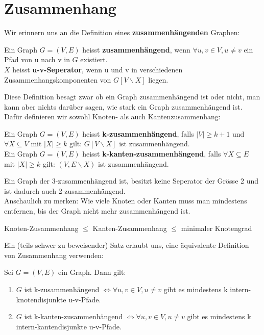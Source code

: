\documentclass[a4paper]{report}
\begin{document}
\chapter{Zusammenhang}

Wir erinnern uns an die Definition eines \textbf{zusammenhängenden} Graphen:

\begin{definition}
    Ein Graph $G = (V,E)$ heisst \textbf{zusammenhängend}, wenn $\forall u,v \in V, u \neq v$ 
    ein Pfad von u nach v in $G$ existiert. \\

    $X$ heisst \textbf{u-v-Seperator}, wenn u und v in verschiedenen Zusammenhangskomponenten von
    $G[V \backslash X]$ liegen.
\end{definition}
\bigskip

Diese Definition besagt zwar ob ein Graph zusammenhängend ist oder nicht, man kann aber nichts darüber sagen,
wie stark ein Graph zusammenhängend ist. Dafür definieren wir sowohl Knoten- als auch Kantenzusammenhang:

\begin{definition}
    Ein Graph $G = (V,E)$ heisst \textbf{k-zusammenhängend}, falls $|V| \geq k + 1$ und $\forall X \subseteq V$
    mit $|X| \geq k$ gilt: $G[V \backslash X]$ ist zusammenhängend. \\

    Ein Graph $G = (V,E)$ heisst \textbf{k-kanten-zusammenhängend}, falls $\forall X \subseteq E$
    mit $|X| \geq k$ gilt: $(V, E \backslash X)$ ist zusammenhängend.
\end{definition}
\bigskip

Ein Graph der 3-zusammenhängend ist, besitzt keine Seperator der Grösse 2 und ist dadurch auch 2-zusammenhängend. \\

Anschaulich zu merken: Wie viele Knoten oder Kanten muss man mindestens entfernen, bis der Graph nicht mehr
zusammenhängend ist.

\begin{lemma}
    Knoten-Zusammenhang $\leq$ Kanten-Zusammenhang $\leq$ minimaler Knotengrad
\end{lemma}
\bigskip

Ein (teils schwer zu beweisender) Satz erlaubt uns, eine äquivalente Definition von Zusammenhang
verwenden:

\begin{satz}
    Sei $G = (V, E)$ ein Graph. Dann gilt:
    \begin{enumerate}
        \item $G$ ist k-zusammenhängend $\Leftrightarrow \forall u,v \in V, u \neq v$ gibt es mindestens k intern-knotendisjunkte u-v-Pfade.
        \item $G$ ist k-kanten-zusammenhängend $\Leftrightarrow \forall u,v \in V, u \neq v$ gibt es mindestens k intern-kantendisjunkte u-v-Pfade.
    \end{enumerate}
\end{satz}
\bigskip
\end{document}
